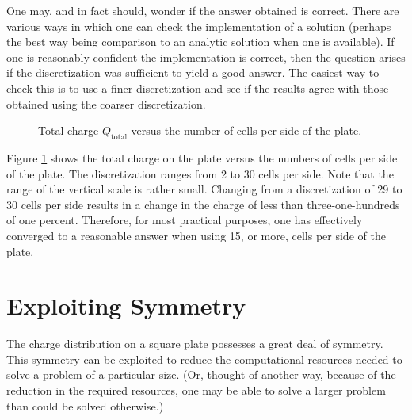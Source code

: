 One may, and in fact should, wonder if the answer obtained is correct.
There are various ways in which one can check the implementation of a
solution (perhaps the best way being comparison to an analytic
solution when one is available).  If one is reasonably confident the
implementation is correct, then the question arises if the
discretization was sufficient to yield a good answer.  The easiest way
to check this is to use a finer discretization and see if the results
agree with those obtained using the coarser discretization.
\begin{figure}
  \begin{center}
  \end{center} \caption{Total charge $Q_{\text{total}}$ versus the
  number of cells per side of the plate.}  \label{fig:chargeVsCells}
\end{figure}
Figure \ref{fig:chargeVsCells} shows the total charge on the plate
versus the numbers of cells per side of the plate.  The discretization
ranges from 2 to 30 cells per side.  Note that the range of the
vertical scale is rather small.  Changing from a discretization of 29
to 30 cells per side results in a change in the charge of less than
three-one-hundreds of one percent.  Therefore, for most practical
purposes, one has effectively converged to a reasonable answer when
using 15, or more, cells per side of the plate.

\section{Exploiting Symmetry}

The charge distribution on a square plate possesses a great deal of
symmetry.  This symmetry can be exploited to reduce the computational
resources needed to solve a problem of a particular size.  (Or,
thought of another way, because of the reduction in the required
resources, one may be able to solve a larger problem than could be
solved otherwise.)

